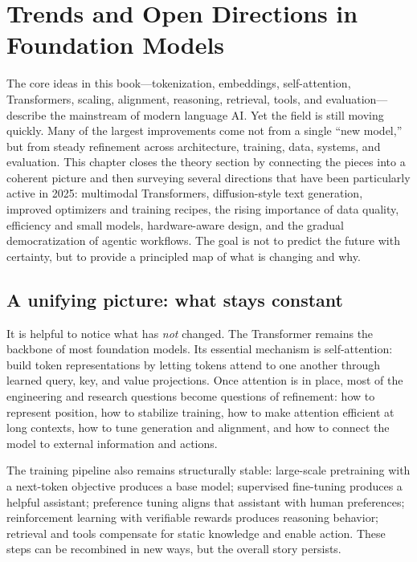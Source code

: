 
\chapter{Trends and Open Directions in Foundation Models}
\label{chap:trends-open-directions}

The core ideas in this book—tokenization, embeddings, self-attention, Transformers, scaling, alignment, reasoning, retrieval, tools, and evaluation—describe the mainstream of modern language AI. Yet the field is still moving quickly. Many of the largest improvements come not from a single “new model,” but from steady refinement across architecture, training, data, systems, and evaluation. This chapter closes the theory section by connecting the pieces into a coherent picture and then surveying several directions that have been particularly active in 2025: multimodal Transformers, diffusion-style text generation, improved optimizers and training recipes, the rising importance of data quality, efficiency and small models, hardware-aware design, and the gradual democratization of agentic workflows. The goal is not to predict the future with certainty, but to provide a principled map of what is changing and why.

\section{A unifying picture: what stays constant}
It is helpful to notice what has \emph{not} changed. The Transformer remains the backbone of most foundation models. Its essential mechanism is self-attention: build token representations by letting tokens attend to one another through learned query, key, and value projections. Once attention is in place, most of the engineering and research questions become questions of refinement: how to represent position, how to stabilize training, how to make attention efficient at long contexts, how to tune generation and alignment, and how to connect the model to external information and actions.

The training pipeline also remains structurally stable: large-scale pretraining with a next-token objective produces a base model; supervised fine-tuning produces a helpful assistant; preference tuning aligns that assistant with human preferences; reinforcement learning with verifiable rewards produces reasoning behavior; retrieval and tools compensate for static knowledge and enable action. These steps can be recombined in new ways, but the overall story persists.

